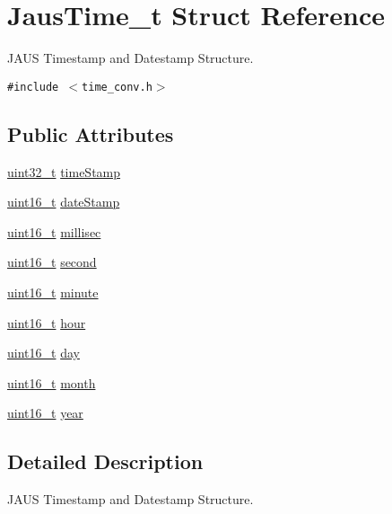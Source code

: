 \hypertarget{structJausTime__t}{
\section{JausTime\_\-t Struct Reference}
\label{structJausTime__t}
}
JAUS Timestamp and Datestamp Structure.  


{\tt \#include $<$time\_\-conv.h$>$}

\subsection*{Public Attributes}
\begin{CompactItemize}
\item 
\hyperlink{libdrdc_8h_06896e8c53f721507066c079052171f8}{uint32\_\-t} \hyperlink{structJausTime__t_d8fac0a7fbf31abd52985347900bd042}{timeStamp}
\item 
\hyperlink{libdrdc_8h_273cf69d639a59973b6019625df33e30}{uint16\_\-t} \hyperlink{structJausTime__t_1b86c063686b07f11d803b1d4b1e4658}{dateStamp}
\item 
\hyperlink{libdrdc_8h_273cf69d639a59973b6019625df33e30}{uint16\_\-t} \hyperlink{structJausTime__t_46cb56461067627813f9ebab05f7b98a}{millisec}
\item 
\hyperlink{libdrdc_8h_273cf69d639a59973b6019625df33e30}{uint16\_\-t} \hyperlink{structJausTime__t_e4d5d34c9c6fe58411a5f5349fbbdd26}{second}
\item 
\hyperlink{libdrdc_8h_273cf69d639a59973b6019625df33e30}{uint16\_\-t} \hyperlink{structJausTime__t_2db8ba5d1dd85dbe1a1c87cc4cd6b7bf}{minute}
\item 
\hyperlink{libdrdc_8h_273cf69d639a59973b6019625df33e30}{uint16\_\-t} \hyperlink{structJausTime__t_02eab65ccc0b0eb1ef2ee8a9660193bd}{hour}
\item 
\hyperlink{libdrdc_8h_273cf69d639a59973b6019625df33e30}{uint16\_\-t} \hyperlink{structJausTime__t_890205c29b20edf5d8194cabfc51bba3}{day}
\item 
\hyperlink{libdrdc_8h_273cf69d639a59973b6019625df33e30}{uint16\_\-t} \hyperlink{structJausTime__t_e057b2dd81b38f33eebfbe40c451af30}{month}
\item 
\hyperlink{libdrdc_8h_273cf69d639a59973b6019625df33e30}{uint16\_\-t} \hyperlink{structJausTime__t_915a14fa672542590d1379f7c26b9e4f}{year}
\end{CompactItemize}


\subsection{Detailed Description}
JAUS Timestamp and Datestamp Structure. 

